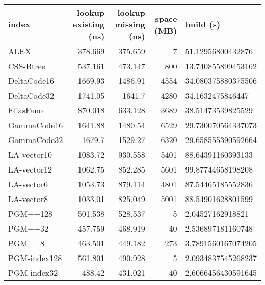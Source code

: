 \begin{tabular}{lrrrl}
\hline
 index             &   lookup existing (ns) &   lookup missing (ns) &   space (MB) & build (s)            \\
\hline
 ALEX              &                378.669 &               375.659 &            7 & 51.12956800432876    \\
 CSS-Btree         &                537.161 &               473.147 &          800 & 13.740855899453162   \\
 DeltaCode16       &               1669.93  &              1486.91  &         4554 & 34.080375880375506   \\
 DeltaCode32       &               1741.05  &              1641.7   &         4280 & 34.1632475846447     \\
 EliasFano         &                870.018 &               633.128 &         3689 & 38.51473539825529    \\
 GammaCode16       &               1641.88  &              1480.54  &         6529 & 29.730070564337073   \\
 GammaCode32       &               1679.7   &              1529.27  &         6320 & 29.658555390592664   \\
 LA-vector10       &               1083.72  &               930.558 &         5401 & 88.64391160393133    \\
 LA-vector12       &               1062.75  &               852.285 &         5601 & 99.87744658198208    \\
 LA-vector6        &               1053.73  &               879.114 &         4801 & 87.54465185552836    \\
 LA-vector8        &               1033.01  &               825.049 &         5001 & 88.54901628801599    \\
 PGM++128          &                501.538 &               528.537 &            5 & 2.04527162918821     \\
 PGM++32           &                457.759 &               468.919 &           40 & 2.536897181160748    \\
 PGM++8            &                463.501 &               449.182 &          273 & 3.7891560167074205   \\
 PGM-index128      &                561.801 &               490.928 &            5 & 2.0934837545268237   \\
 PGM-index32       &                488.42  &               431.021 &           40 & 2.6066456430591645   \\

\end{tabular}
